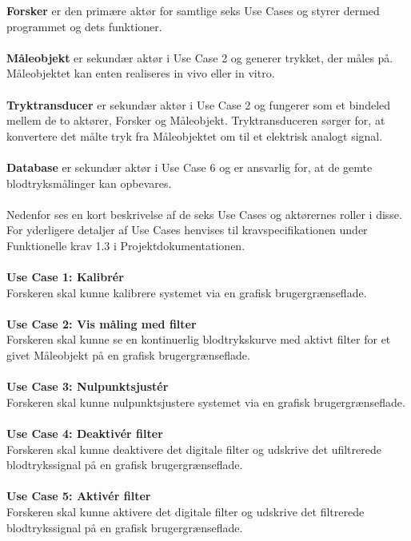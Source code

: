 \textbf{Forsker} er den primære aktør for samtlige seks Use Cases og styrer dermed programmet og dets funktioner.
\\\\
\textbf{Måleobjekt} er sekundær aktør i Use Case 2 og generer trykket, der måles på. Måleobjektet kan enten realiseres in vivo eller in vitro.
\\\\
\textbf{Tryktransducer} er sekundær aktør i Use Case 2 og fungerer som et bindeled mellem de to aktører, Forsker og Måleobjekt. Tryktransduceren sørger for, at konvertere det målte tryk fra Måleobjektet om til et elektrisk analogt signal.
\\\\
\textbf{Database} er sekundær aktør i Use Case 6 og er ansvarlig for, at de gemte blodtryksmålinger kan opbevares.
\\\\
Nedenfor ses en kort beskrivelse af de seks Use Cases og aktørernes roller i disse. For yderligere detaljer af Use Cases henvises til kravspecifikationen under Funktionelle krav 1.3 i Projektdokumentationen.
\\\\
\textbf{Use Case 1: Kalibrér}\\
Forskeren skal kunne kalibrere systemet via en grafisk brugergrænseflade.
\\\\
\textbf{Use Case 2: Vis måling med filter}\\
Forskeren skal kunne se en kontinuerlig blodtrykskurve med aktivt filter for et givet Måleobjekt på en grafisk brugergrænseflade. 
\\\\
\textbf{Use Case 3: Nulpunktsjustér}\\
Forskeren skal kunne nulpunktsjustere systemet via en grafisk brugergrænseflade.
\\\\
\textbf{Use Case 4: Deaktivér filter}\\
Forskeren skal kunne deaktivere det digitale filter og udskrive det ufiltrerede blodtrykssignal på en grafisk brugergrænseflade.
\\\\
\textbf{Use Case 5: Aktivér filter}\\
Forskeren skal kunne aktivere det digitale filter og udskrive det filtrerede blodtrykssignal på en grafisk brugergrænseflade.
\\\\
